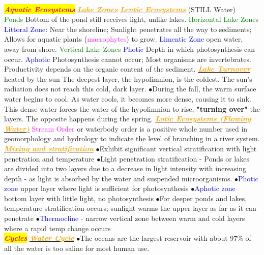 \documentclass{article}
\newcommand{\ddd}{$\bullet$}
\newcommand{\red}[1]{\textcolor{red}{#1}}
\newcommand{\green}[1]{\textcolor{green}{#1}}
\newcommand{\blue}[1]{\textcolor{blue}{#1}}
\newcommand{\pink}[1]{\textcolor{magenta}{#1}}
\newcommand{\orange}[1]{\textcolor{orange}{#1}}
\newcommand{\mysection}[1]{\colorbox{yellow}{\textbf{\textit{\red{#1}}}}}
\newcommand{\mysubsection}[1]{\underline{\textbf{{\textit{\orange{#1}}}}}}
\newcommand{\mysubsub}[1]{{{\green{#1}}}}
\newcommand{\mysubsubsub}[1]{{{\blue{#1}}}}
\newcommand{\vocab}[1]{{\pink{#1}}}
\begin{document}
\begin{multicols*}{4}
    \\
    \mysection{Aquatic Ecosystems}
        \mysubsection{Lake Zones}
            \mysubsection{Lentic Ecosystems} (STILL Water) \\
            \mysubsub{Ponds} Bottom of the pond still receives light, unlike lakes.
            \mysubsub{Horizontal Lake Zones}
                \mysubsubsub{Littoral Zone}: Near the shoreline; Sunlight penetrates all the way to sediments; Allows for aquatic plants (\vocab{macrophytes}) to grow.
                \mysubsubsub{Limentic Zone} open water, away from shore.
            \mysubsub{Vertical Lake Zones}
                \mysubsubsub{Photic}
                    Depth in which photosynthesis can occur.
                \mysubsubsub{Aphotic}
                Photosynthesis cannot occur; Most organisms are invertebrates. Productivity depends on the organic content of the sediment.
          \mysubsection{Lake Turnover}
               heated by the sun The deepest layer, the hypolimnion, is the coldest. The sun's radiation does not reach this cold, dark layer. 
        	  \ddd During the fall, the warm surface water begins to cool. As water cools, it becomes more dense, causing it to sink. This dense water forces the water of the hypolimnion to rise, \textbf{"turning over"} the layers. The opposite happens during the spring.
        	  \mysubsection{Lotic Ecosystems (Flowing Water)}
        	  \vocab{Stream Order} or waterbody order is a positive whole number used in geomorphology and hydrology to indicate the level of branching in a river system. 
        \mysubsection{Mixing and stratification}
            \ddd Exhibit significant vertical stratification with light penetration and temperature 
            \ddd Light penetration stratification - Ponds or lakes are divided into two layers due to a decrease in light intensity with increasing depth - as light is absorbed by the water and suspended microorganisms.
            \ddd \blue{Photic zone} upper layer where light is sufficient for photosynthesis
            \ddd \blue{Aphotic zone} bottom layer with little light, no photosynthesis
            \ddd For deeper ponds and lakes, temperature stratification occurs; sunlight warms the upper layer as far as it can penetrate
            \ddd \blue{Thermocline} - narrow vertical zone between warm and cold layers where a rapid temp change occurs 
   	\\
	\mysection{Cycles}
		\mysubsection{Water Cycle}
			\ddd The oceans are the largest reservoir with about 97\% of all the water is too saline for most human use.

\end{multicols*}
\end{document}
